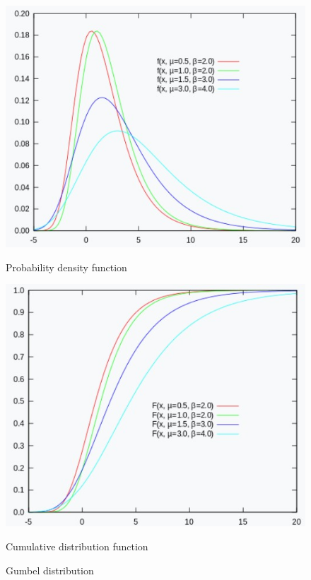 \documentclass[12 pts]{article}
\begin{document}
\begin{figure}[H]
\begin{minipage}[h]{0.45\textwidth}
\includegraphics[width=\linewidth]{Probability density function}
\caption*{Probability density function}
\end{minipage}
\hspace{\fill}
\begin{minipage}[h]{0.45\textwidth}
\includegraphics[width=\linewidth]{Cumulative distribution function}
\caption*{Cumulative distribution function}
\label{fig:Gumbel distributionh}
\end{minipage}
\caption{Gumbel distribution} 
\end{figure}
\end{document}
